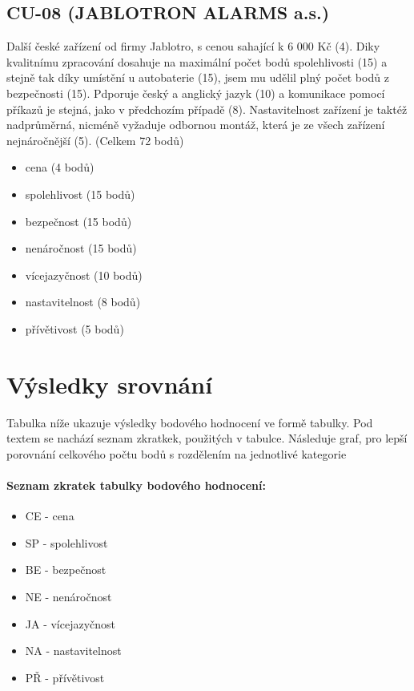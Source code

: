 \documentclass[FM,BP]{tulthesis}  %
\begin{document}
\subsection{CU-08 (JABLOTRON ALARMS a.s.)}
Další české zařízení od firmy Jablotro, s cenou sahající k 6 000 Kč (4). Diky kvalitnímu zpracování dosahuje na maximální počet bodů spolehlivosti (15) a stejně tak díky umístění u autobaterie (15), jsem mu udělil plný počet bodů z bezpečnosti (15). Pdporuje český a anglický jazyk (10) a komunikace pomocí příkazů je stejná, jako v předchozím případě (8). Nastavitelnost zařízení je taktéž nadprůměrná, nicméně vyžaduje odbornou montáž, která je ze všech zařízení nejnáročnější (5). (Celkem 72 bodů)

\begin{itemize}
\item cena (4 bodů)
\item spolehlivost (15 bodů)
\item bezpečnost (15 bodů)
\item nenáročnost (15 bodů)
\item vícejazyčnost (10 bodů)
\item nastavitelnost (8 bodů)
\item přívětivost (5 bodů)
\end{itemize}


\section{Výsledky srovnání}
Tabulka níže ukazuje výsledky bodového hodnocení ve formě tabulky. Pod textem se nachází seznam zkratkek, použitých v tabulce. Následuje graf, pro lepší  porovnání celkového počtu bodů s rozdělením na jednotlivé kategorie
\paragraph{Seznam zkratek tabulky bodového hodnocení:}
\begin{itemize}
\item CE - cena
\item SP - spolehlivost
\item BE - bezpečnost
\item NE - nenáročnost
\item JA - vícejazyčnost
\item NA - nastavitelnost
\item PŘ - přívětivost
\end{itemize}
\end{document}
